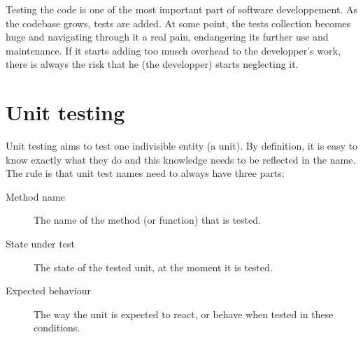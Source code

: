 %
%

%
%
%
%

Testing the code is one of the most important part of software 
developpement. As the codebase grows, tests are added. At some 
point, the tests collection becomes huge and navigating through 
it a real pain, endangering its further use and maintenance. If 
it starts adding too musch overhead to the developper's work, 
there is always the risk that he (the developper) starts neglecting 
it.

\section{Unit testing}

Unit testing aims to test one indivisible entity (a unit). By definition, 
it is easy to know exactly what they do and this knowledge needs 
to be reflected in the name. The rule is that unit test names need to 
always have three parts:

\begin{description}
 \item[Method name]        The name of the method (or function) that is tested.
 
 \item[State under test]   The state of the tested unit, at the moment 
                           it is tested.

 \item[Expected behaviour] The way the unit is expected to react, or behave 
                           when tested in these conditions.
\end{description}

